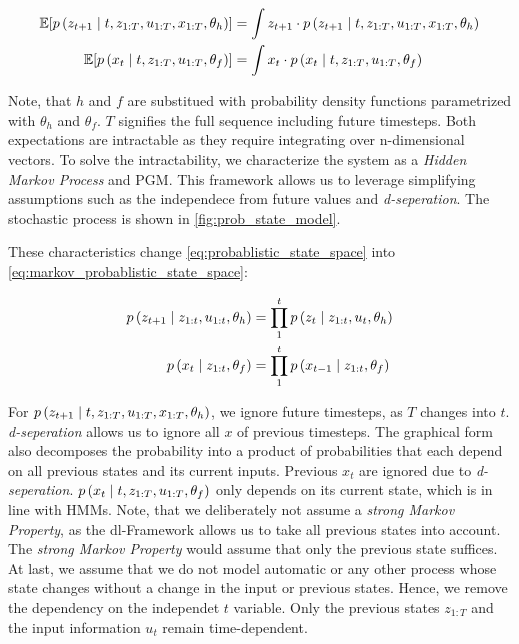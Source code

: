 \documentclass[12pt,a4paper]{report}
\begin{document}
\begin{align}
    \label{eq:probablistic_state_space}
    \mathbb{E}[p\left(z_{t+1} \mid t, z_{1:T}, u_{1:T}, x_{1:T}, \theta_h\right)] & =
    \int z_{t+1} \cdot p\left(z_{t+1} \mid t, z_{1:T}, u_{1:T}, x_{1:T}, \theta_h\right) \\
    \mathbb{E}[p\left(x_t \mid t, z_{1:T}, u_{1:T}, \theta_f\right)]   & =
    \int x_{t} \cdot p\left(x_t \mid t, z_{1:T}, u_{1:T}, \theta_f\right) \nonumber
\end{align}

Note, that $h$ and $f$ are substitued with probability density functions parametrized with $\theta_h$ and $\theta_f$. $T$ signifies the full sequence including future timesteps.
Both expectations are intractable as they require integrating over n-dimensional vectors. To solve the intractability, we characterize the system as a \emph{Hidden Markov Process} and \gls{PGM}. This framework allows us to leverage simplifying assumptions such as the independece from future values and \emph{d-seperation}. The stochastic process is shown in \autoref{fig:prob_state_model}.


These characteristics change \autoref{eq:probablistic_state_space} into \autoref{eq:markov_probablistic_state_space}:

\begin{align}
    \label{eq:encoder_probability}
    p\left(z_{t+1} \mid z_{1:t}, u_{1:t}, \theta_h\right)                   & =  \prod_{1}^{t} p\left(z_t \mid z_{1:t}, u_{t}, \theta_h\right) \\
    \label{eq:decoder_probability}
    p\left(x_t \mid z_{1:t}, \theta_f\right)                   & = \prod_{1}^{t} p\left(x_{t-1} \mid z_{1:t},\theta_f\right)
\end{align}

For $p\left(z_{t+1} \mid t, z_{1:T}, u_{1:T}, x_{1:T}, \theta_h\right)$, we ignore future timesteps, as $T$ changes into $t$. \emph{d-seperation} allows us to ignore all $x$ of previous timesteps. The graphical form also decomposes the probability into a product of probabilities that each depend on all previous states and its current inputs. Previous $x_t$ are ignored due to \emph{d-seperation}. $p\left(x_t \mid t, z_{1:T}, u_{1:T}, \theta_f\right)$ only depends on its current state, which is in line with \glspl{HMM}.
Note, that we deliberately not assume a \emph{strong Markov Property}, as the \gls{dl}-Framework allows us to take all previous states into account. The \emph{strong Markov Property} would assume that only the previous state suffices. At last, we assume that we do not model automatic or any other process whose state changes without a change in the input or previous states. Hence, we remove the dependency on the independet $t$ variable. Only the previous states $z_{1:T}$ and the input information $u_t$ remain time-dependent. 
\end{document}
